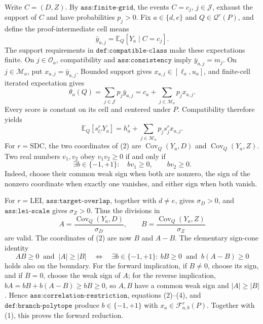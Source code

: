 Write \(C=(D,Z)\).  By \(\texttt{ass:finite-grid}\), the events \(C=c_j\), \(j\in\mathcal J\), exhaust the support of \(C\) and have probabilities \(p_j>0\).  Fix \(a\in\{d,e\}\) and \(Q\in\mathcal Q^r(P)\), and define the proof-intermediate cell means
\[
 \bar y_{a,j}=\mathbb E_Q[Y_a\mid C=c_j].
\]
The support requirements in \(\texttt{def:compatible-class}\) make these expectations finite.  On \(j\in\mathcal O_a\), compatibility and \(\texttt{ass:consistency}\) imply \(\bar y_{a,j}=m_j\).  On \(j\in\mathcal M_a\), put \(x_{a,j}=\bar y_{a,j}\).  Bounded support gives \(x_{a,j}\in[\ell_a,u_a]\), and finite-cell iterated expectation gives
\[
 \theta_a(Q)
 =\sum_{j\in\mathcal J}p_j\bar y_{a,j}
 =c_a+\sum_{j\in\mathcal M_a}p_jx_{a,j}.                                      \tag{1}
\]
Every score is constant on its cell and centered under \(P\).  Compatibility therefore yields
\[
 \mathbb E_Q[s_C^rY_a]
 =h_a^r+\sum_{j\in\mathcal M_a}p_js_j^rx_{a,j}.                               \tag{2}
\]
For \(r=\mathrm{SDC}\), the two coordinates of (2) are \(\operatorname{Cov}_Q(Y_a,D)\) and \(\operatorname{Cov}_Q(Y_a,Z)\).  Two real numbers \(v_1,v_2\) obey \(v_1v_2\ge0\) if and only if
\[
 \exists b\in\{-1,+1\}:\quad bv_1\ge0,\qquad bv_2\ge0.                       \tag{3}
\]
Indeed, choose their common weak sign when both are nonzero, the sign of the nonzero coordinate when exactly one vanishes, and either sign when both vanish.

For \(r=\mathrm{LEI}\), \(\texttt{ass:target-overlap}\), together with \(d\ne e\), gives \(\sigma_D>0\), and \(\texttt{ass:lei-scale}\) gives \(\sigma_Z>0\).  Thus the divisions in
\[
 A=\frac{\operatorname{Cov}_Q(Y_a,D)}{\sigma_D},
 \qquad
 B=\frac{\operatorname{Cov}_Q(Y_a,Z)}{\sigma_Z}
\]
are valid.  The coordinates of (2) are now \(B\) and \(A-B\).  The elementary sign-cone identity
\[
 AB\ge0\ \text{ and }\ |A|\ge|B|
 \quad\Longleftrightarrow\quad
 \exists b\in\{-1,+1\}:\ bB\ge0\ \text{ and }\ b(A-B)\ge0                 \tag{4}
\]
holds also on the boundary.  For the forward implication, if \(B\ne0\), choose its sign, and if \(B=0\), choose the weak sign of \(A\); for the reverse implication, \(bA=bB+b(A-B)\ge bB\ge0\), so \(A,B\) have a common weak sign and \(|A|\ge|B|\).  Hence \(\texttt{ass:correlation-restriction}\), equations (2)--(4), and \(\texttt{def:branch-polytope}\) produce \(b\in\{-1,+1\}\) with \(x_a\in\mathcal F_{a,b}^r(P)\).  Together with (1), this proves the forward reduction.

